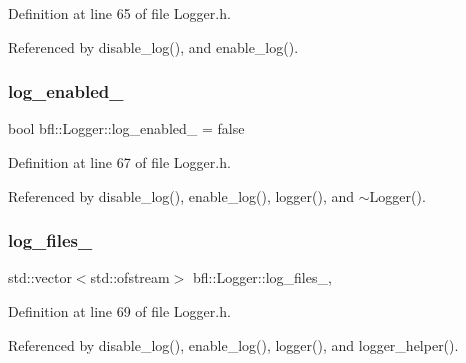 Definition at line 65 of file Logger.\+h.



Referenced by disable\+\_\+log(), and enable\+\_\+log().

\mbox{\label{classbfl_1_1Logger_a1cd59822387b9c61b38699e011bfb277}} 
\subsubsection{\texorpdfstring{log\+\_\+enabled\+\_\+}{log\_enabled\_}}
{\footnotesize\ttfamily bool bfl\+::\+Logger\+::log\+\_\+enabled\+\_\+ = false\hspace{0.3cm}{\ttfamily [private]}}



Definition at line 67 of file Logger.\+h.



Referenced by disable\+\_\+log(), enable\+\_\+log(), logger(), and $\sim$\+Logger().

\mbox{\label{classbfl_1_1Logger_a3cc2276bf1ad03941f1eca92c352b9c4}} 
\subsubsection{\texorpdfstring{log\+\_\+files\+\_\+}{log\_files\_}}
{\footnotesize\ttfamily std\+::vector$<$std\+::ofstream$>$ bfl\+::\+Logger\+::log\+\_\+files\+\_\+\hspace{0.3cm}{\ttfamily [mutable]}, {\ttfamily [private]}}



Definition at line 69 of file Logger.\+h.



Referenced by disable\+\_\+log(), enable\+\_\+log(), logger(), and logger\+\_\+helper().

\mbox{\label{classbfl_1_1Logger_af93f5d2f3afc6874255701905981d776}} 
